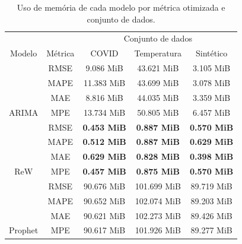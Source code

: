 \begin{table}[htbp]
    \caption{Uso de memória de cada modelo por métrica otimizada e conjunto de dados.}\label{tab:memoria}
    \centering
    \begin{tabular}{@{}ccccc@{}} \toprule
                                  &                           & \multicolumn{3}{c}{Conjunto de dados}                                                                 \\ \cmidrule{3-5}
        \multirow{-2}{*}{Modelo}  & \multirow{-2}{*}{Métrica} & \multicolumn{1}{c}{COVID}              & \multicolumn{1}{c}{Temperatura}        & Sintético          \\ \midrule
                                  & RMSE                      & \multicolumn{1}{c}{9.086 MiB}          & \multicolumn{1}{c}{43.621 MiB}         & 3.105 MiB          \\
                                  & MAPE                      & \multicolumn{1}{c}{11.383 MiB}         & \multicolumn{1}{c}{43.699 MiB}         & 3.078 MiB          \\
                                  & MAE                       & \multicolumn{1}{c}{8.816 MiB}          & \multicolumn{1}{c}{44.035 MiB}         & 3.359 MiB          \\
        \multirow{-4}{*}{ARIMA}   & MPE                       & \multicolumn{1}{c}{13.734 MiB}         & \multicolumn{1}{c}{50.805 MiB}         & 6.457 MiB          \\ \midrule
                                  & RMSE                      & \multicolumn{1}{c}{\textbf{0.453 MiB}} & \multicolumn{1}{c}{\textbf{0.887 MiB}} & \textbf{0.570 MiB} \\
                                  & MAPE                      & \multicolumn{1}{c}{\textbf{0.512 MiB}} & \multicolumn{1}{c}{\textbf{0.887 MiB}} & \textbf{0.629 MiB} \\
                                  & MAE                       & \multicolumn{1}{c}{\textbf{0.629 MiB}} & \multicolumn{1}{c}{\textbf{0.828 MiB}} & \textbf{0.398 MiB} \\
        \multirow{-4}{*}{ReW}     & MPE                       & \multicolumn{1}{c}{\textbf{0.457 MiB}} & \multicolumn{1}{c}{\textbf{0.875 MiB}} & \textbf{0.570 MiB} \\ \midrule
                                  & RMSE                      & \multicolumn{1}{c}{90.676 MiB}         & \multicolumn{1}{c}{101.699 MiB}        & 89.719 MiB         \\
                                  & MAPE                      & \multicolumn{1}{c}{90.652 MiB}         & \multicolumn{1}{c}{102.074 MiB}        & 89.203 MiB         \\
                                  & MAE                       & \multicolumn{1}{c}{90.621 MiB}         & \multicolumn{1}{c}{102.273 MiB}        & 89.426 MiB         \\
        \multirow{-4}{*}{Prophet} & MPE                       & \multicolumn{1}{c}{90.617 MiB}         & \multicolumn{1}{c}{101.926 MiB}        & 89.277 MiB         \\ \bottomrule
    \end{tabular}
\end{table}


